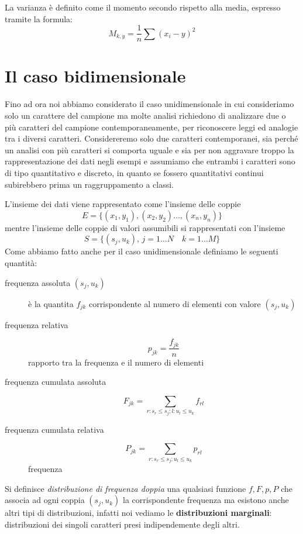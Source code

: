\documentclass[a4paper,12pt, oneside]{book}
\begin{document}
La varianza è definito come il momento secondo rispetto alla media, espresso tramite la formula:
\[ M_{k,y}=\frac{1}{n}\sum (x_i-y)^2 \]

\section{Il caso bidimensionale}
Fino ad ora noi abbiamo considerato il caso unidimensionale in cui consideriamo solo un carattere del campione ma 
molte analisi richiedono di analizzare due o più caratteri del campione contemporaneamente, per riconoscere 
leggi ed analogie tra i diversi caratteri.\newline
Considereremo solo due caratteri contemporanei, sia perché un analisi con più caratteri si comporta uguale e sia 
per non aggravare troppo la rappresentazione dei dati negli esempi e assumiamo che entrambi i caratteri sono di
tipo quantitativo e discreto, in quanto se fossero quantitativi continui subirebbero prima un raggruppamento a classi.

L'insieme dei dati viene rappresentato come l'insieme delle coppie
\[ E = \{(x_1, y_1), (x_2, y_2) \dots, (x_n, y_n)\} \]
mentre l'insieme delle coppie di valori assumibili si rappresentati con l'insieme
\[ S = \{(s_j, u_k), \, j = 1 \dots N \quad k = 1 \dots M\} \]
Come abbiamo fatto anche per il caso unidimensionale definiamo le seguenti quantità:
\begin{description}
    \item [frequenza assoluta $(s_j, u_k)$] è la quantita $f_{jk}$ corrispondente al numero di elementi con valore $(s_j, u_k)$
    \item [frequenza relativa] \[ p_{jk} = \frac{f_{jk}}{n} \] rapporto tra la frequenza e il numero di elementi
    \item [frequenza cumulata assoluta]  \[ F_{jk} = \sum _{r:s_r \leq s_j; l:u_l \leq u_k} f_{rl} \]
    \item [frequenza cumulata relativa] \[ P_{jk} = \sum _{r:s_r \leq s_j; u_l \leq u_k} p_{rl} \] frequenza 
\end{description}
Si definisce \emph{distribuzione di frequenza doppia} una qualsiasi funzione $f, F, p, P$ 
che associa ad ogni coppia $(s_j, u_k)$ la corrispondente frequenza ma esistono anche altri tipi di distribuzioni,
infatti noi vediamo le \textbf{distribuzioni marginali}: distribuzioni dei singoli caratteri presi indipendemente degli altri.
\end{document}
